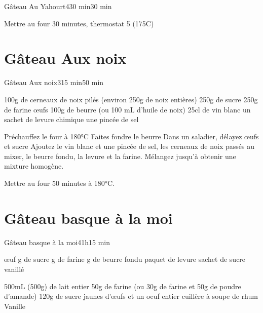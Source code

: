 {\begin{recette}{Gâteau Au Yahourt}{4}{30 min}{30 min}
\begin{cuisson}
Mettre au four 30 minutes, thermostat 5 (175\degres C)
\end{cuisson}
\end{recette}

\section{Gâteau Aux noix}
\begin{recette}{Gâteau Aux noix}{3}{15 min}{50 min}

\begin{ingredients}
\ingredient 100g de cerneaux de noix pilés (environ 250g de noix entières)
\ingredient 250g de sucre
\ingredient 250g de farine
 œufs
\ingredient 100g de beurre (ou 100 mL d'huile de noix)
\ingredient 25cl de vin blanc
\ingredient un sachet de levure chimique
\ingredient une pincée de sel
\end{ingredients}

\begin{preparation}
\etape Préchauffez le four à 180°C
\etape Faites fondre le beurre
\etape Dans un saladier, délayez œufs et sucre
\etape Ajoutez le vin blanc et une pincée de sel, les cerneaux de noix passés au mixer, le beurre fondu, la levure et la 
farine. 
\etape Mélangez jusqu'à obtenir une mixture homogène. 
\end{preparation}

\begin{cuisson}
Mettre au four 50 minutes à 180°C.
\end{cuisson}
\end{recette}


\section{Gâteau basque à la moi}
\begin{recette}{Gâteau basque à la moi}{4}{1h}{15 min}
\begin{ingredients}
\ingredient[pâte]
 œuf
 g de sucre
 g de farine
 g de beurre fondu
 paquet de levure
 sachet de sucre vanillé
\ingredient[crème]

\ingredient 500mL (500g) de lait entier
\ingredient 50g de farine (ou 30g de farine et 50g de poudre d'amande)
\ingredient 120g de sucre
 jaunes d'œufs et un oeuf entier
 cuillère à soupe de rhum
\ingredient Vanille
\end{ingredients}


\end{recette}}

